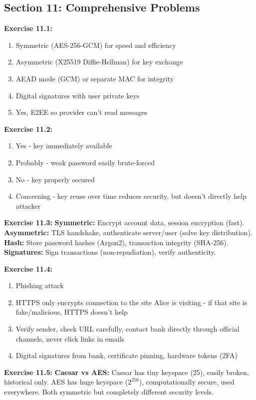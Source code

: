 \documentclass[11pt,a4paper]{report}
\begin{document}
\subsection*{Section 11: Comprehensive Problems}

\textbf{Exercise 11.1:}
\begin{enumerate}[label=\alph*)]
    \item Symmetric (AES-256-GCM) for speed and efficiency
    \item Asymmetric (X25519 Diffie-Hellman) for key exchange
    \item AEAD mode (GCM) or separate MAC for integrity
    \item Digital signatures with user private keys
    \item Yes, E2EE so provider can't read messages
\end{enumerate}

\textbf{Exercise 11.2:}
\begin{enumerate}[label=\alph*)]
    \item Yes - key immediately available
    \item Probably - weak password easily brute-forced
    \item No - key properly secured
    \item Concerning - key reuse over time reduces security, but doesn't directly help attacker
\end{enumerate}

\textbf{Exercise 11.3:}
\textbf{Symmetric:} Encrypt account data, session encryption (fast). \textbf{Asymmetric:} TLS handshake, authenticate server/user (solve key distribution). \textbf{Hash:} Store password hashes (Argon2), transaction integrity (SHA-256). \textbf{Signatures:} Sign transactions (non-repudiation), verify authenticity.

\textbf{Exercise 11.4:}
\begin{enumerate}[label=\alph*)]
    \item Phishing attack
    \item HTTPS only encrypts connection to the site Alice is visiting - if that site is fake/malicious, HTTPS doesn't help
    \item Verify sender, check URL carefully, contact bank directly through official channels, never click links in emails
    \item Digital signatures from bank, certificate pinning, hardware tokens (2FA)
\end{enumerate}

\textbf{Exercise 11.5:}
\textbf{Caesar vs AES:} Caesar has tiny keyspace (25), easily broken, historical only. AES has huge keyspace ($2^{256}$), computationally secure, used everywhere. Both symmetric but completely different security levels.
\end{document}
